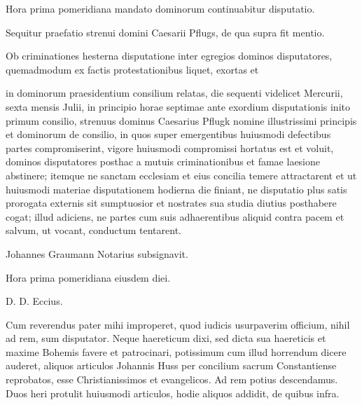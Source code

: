 Hora prima pomeridiana mandato dominorum continuabitur disputatio.

Sequitur praefatio strenui domini Caesarii Pflugs, de qua supra fit mentio.

Ob criminationes hesterna disputatione inter egregios dominos disputatores, quemadmodum ex factis protestationibus liquet, exortas et

in dominorum praesidentium consilium relatas, die sequenti videlicet Mercurii, sexta mensis Julii, in principio horae septimae ante exordium disputationis inito primum consilio, strenuus dominus Caesarius Pflugk nomine illustrissimi principis et dominorum de consilio, in quos super emergentibus huiusmodi defectibus partes compromiserint, vigore huiusmodi compromissi hortatus est et voluit, dominos disputatores posthac a mutuis criminationibus et famae laesione abstinere; itemque ne sanctam ecclesiam et eius concilia temere attractarent et ut huiusmodi materiae disputationem hodierna die finiant, ne disputatio plus satis prorogata externis sit sumptuosior et nostrates sua studia diutius posthabere cogat; illud adiciens, ne partes cum suis adhaerentibus aliquid contra pacem et salvum, ut vocant, conductum tentarent.

Johannes Graumann Notarius subsignavit.

Hora prima pomeridiana eiusdem diei.

D. D. Eccius.

Cum reverendus pater mihi improperet, quod iudicis usurpaverim officium, nihil ad rem, sum disputator. Neque haereticum dixi, sed dicta sua haereticis et maxime Bohemis favere et patrocinari, potissimum cum illud horrendum dicere auderet, aliquos articulos Johannis Huss per concilium sacrum Constantiense reprobatos, esse Christianissimos et evangelicos. Ad rem potius descendamus. Duos heri protulit huiusmodi articulos, hodie aliquos addidit, de quibus infra.

